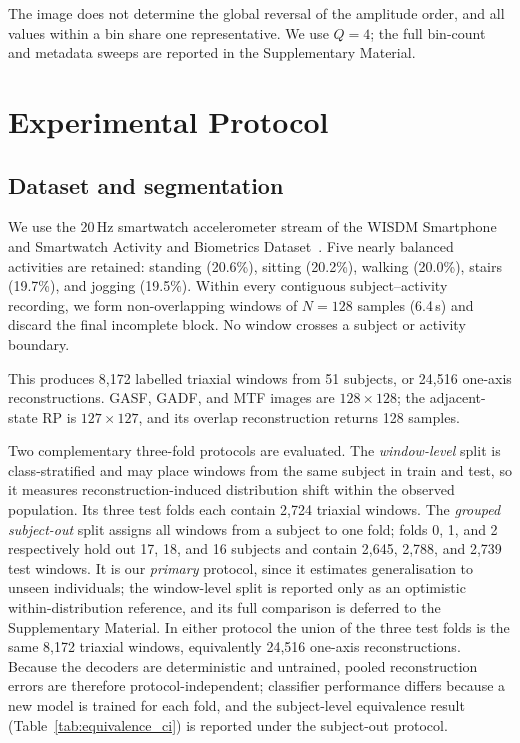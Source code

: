\documentclass[5p]{elsarticle}
\begin{document}
The image does not determine the global reversal of the amplitude order, and all values within a bin share one representative. We use \(Q=4\); the full bin-count and metadata sweeps are reported in the Supplementary Material.
\section{Experimental Protocol}\label{sec:experimental_protocol}

\subsection{Dataset and segmentation}

We use the 20\,Hz smartwatch accelerometer stream of the WISDM Smartphone and Smartwatch Activity and Biometrics Dataset~\cite{misc_wisdm_smartphone_and_smartwatch_activity_and_biometrics_dataset__507}. Five nearly balanced activities are retained: standing (20.6\%), sitting (20.2\%), walking (20.0\%), stairs (19.7\%), and jogging (19.5\%). Within every contiguous subject--activity recording, we form non-overlapping windows of \(N=128\) samples (6.4\,s) and discard the final incomplete block. No window crosses a subject or activity boundary.

This produces 8,172 labelled triaxial windows from 51 subjects, or 24,516 one-axis reconstructions. GASF, GADF, and MTF images are \(128\times128\); the adjacent-state RP is \(127\times127\), and its overlap reconstruction returns 128 samples.

Two complementary three-fold protocols are evaluated. The \emph{window-level} split is class-stratified and may place windows from the same subject in train and test, so it measures reconstruction-induced distribution shift within the observed population. Its three test folds each contain 2,724 triaxial windows. The \emph{grouped subject-out} split assigns all windows from a subject to one fold; folds 0, 1, and 2 respectively hold out 17, 18, and 16 subjects and contain 2,645, 2,788, and 2,739 test windows. It is our \emph{primary} protocol, since it estimates generalisation to unseen individuals; the window-level split is reported only as an optimistic within-distribution reference, and its full comparison is deferred to the Supplementary Material. In either protocol the union of the three test folds is the same 8,172 triaxial windows, equivalently 24,516 one-axis reconstructions. Because the decoders are deterministic and untrained, pooled reconstruction errors are therefore protocol-independent; classifier performance differs because a new model is trained for each fold, and the subject-level equivalence result (Table~\ref{tab:equivalence_ci}) is reported under the subject-out protocol.
\end{document}
